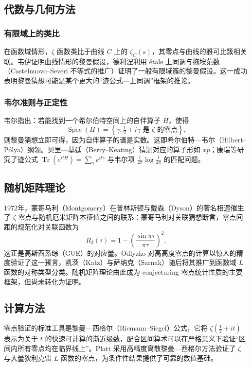 \subsection{代数与几何方法}

\subsubsection{有限域上的类比}

在函数域情形，$\zeta$ 函数类比于曲线 $C$ 上的 $\zeta_C(s)$，其零点与曲线的雅可比簇相关联。韦伊证明曲线情形的黎曼假设\cite{weil1948courbes}，德利涅利用 étale 上同调与拖埃范数（Castelnuovo--Severi 不等式的推广）证明了一般有限域簇的黎曼假设\cite{deligne1974weil}。这一成功表明黎曼猜想可能是某个更大的“迹公式—上同调”框架的推论。

\subsubsection{韦尔准则与正定性}

韦尔指出：若能找到一个希尔伯特空间上的自伴算子 $H$，使得
\begin{equation}
    \operatorname{Spec}(H) = \left\{\gamma : \tfrac{1}{2} + i\gamma \text{ 是 } \zeta \text{ 的零点}\right\},
\end{equation}
则黎曼猜想立即可得，因为自伴算子的谱是实数。这即希尔伯特—韦尔（Hilbert--Pólya）纲领。贝里—基廷（Berry--Keating）猜测对应的算子形如 $xp$\cite{berry1999heisenberg}；康瑞等研究了迹公式 $\operatorname{Tr}(e^{itH}) = \sum_{\gamma} e^{it\gamma}$ 与韦尔项 $\frac{t}{2\pi}\log \frac{t}{2\pi}$ 的匹配问题。

\subsection{随机矩阵理论}

1972年，蒙哥马利（Montgomery）在普林斯顿与戴森（Dyson）的著名相遇催生了 $\zeta$ 零点与随机厄米矩阵本征值之间的联系：蒙哥马利对关联猜想\cite{montgomery1973pair}断言，零点间距的规范化对关联函数为
\begin{equation}
    R_2(\tau) = 1 - \left(\frac{\sin \pi \tau}{\pi \tau}\right)^2,
\end{equation}
这正是高斯酉系综（GUE）的对应量。Odlyzko 对高高度零点的计算\cite{odlyzko1987zeros}以惊人的精度验证了这一预言，凯茨（Katz）与萨纳克（Sarnak）随后将其推广到函数域 $L$ 函数的对称类型分类\cite{katz1999zeros}。随机矩阵理论由此成为 conjecturing 零点统计性质的主要框架，但尚未转化为证明。

\subsection{计算方法}

零点验证的标准工具是黎曼—西格尔（Riemann--Siegel）公式，它将 $\zeta(\tfrac{1}{2}+it)$ 表示为关于 $t$ 的快速可计算的渐近级数，配合区间算术可以在严格意义下验证“区间内所有零点均在临界线上”。Platt 采用高精度离散黎曼—西格尔方法验证了 $\zeta$ 与大量狄利克雷 $L$ 函数的零点\cite{platt2021verification}，为条件性结果提供了可靠的数值基础。
